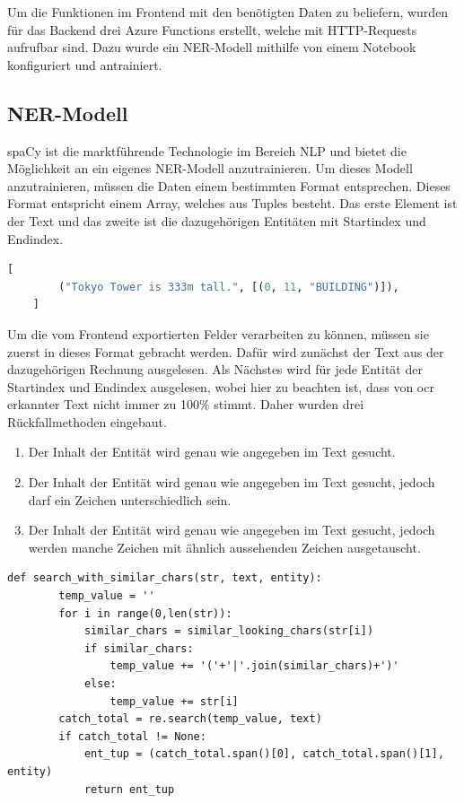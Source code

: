 Um die Funktionen im Frontend mit den benötigten Daten zu beliefern, wurden für das Backend drei Azure Functions erstellt, welche mit HTTP-Requests aufrufbar sind. Dazu wurde ein NER-Modell mithilfe von einem Notebook konfiguriert und antrainiert.

\subsection{NER-Modell}

spaCy ist die marktführende Technologie im Bereich NLP und bietet die Möglichkeit an ein eigenes NER-Modell anzutrainieren. Um dieses Modell anzutrainieren, müssen die Daten einem bestimmten Format entsprechen. Dieses Format entspricht einem Array, welches aus Tuples besteht. Das erste Element ist der Text und das zweite ist die dazugehörigen Entitäten mit Startindex und Endindex.

\begin{lstlisting}[language=Python, caption={Beispiel für ein Array mit Trainingsdaten}]
    [
        ("Tokyo Tower is 333m tall.", [(0, 11, "BUILDING")]),
    ]   
\end{lstlisting}

Um die vom Frontend exportierten Felder verarbeiten zu können, müssen sie zuerst in dieses Format gebracht werden. Dafür wird zunächst der Text aus der dazugehörigen Rechnung ausgelesen. Als Nächstes wird für jede Entität der Startindex und Endindex ausgelesen, wobei hier zu beachten ist, dass von \gls{ocr} erkannter Text nicht immer zu 100\% stimmt. Daher wurden drei Rückfallmethoden eingebaut.

\begin{enumerate}
    \item Der Inhalt der Entität wird genau wie angegeben im Text gesucht.
    \item Der Inhalt der Entität wird genau wie angegeben im Text gesucht, jedoch darf ein Zeichen unterschiedlich sein.
    \item Der Inhalt der Entität wird genau wie angegeben im Text gesucht, jedoch werden manche Zeichen mit ähnlich aussehenden Zeichen ausgetauscht. 
\end{enumerate}

\begin{minipage}{\linewidth}
\begin{lstlisting}[caption={Rückfallmethode 3}, label={search_with_similar_chars}]
    def search_with_similar_chars(str, text, entity):
        temp_value = ''
        for i in range(0,len(str)):
            similar_chars = similar_looking_chars(str[i])
            if similar_chars:
                temp_value += '('+'|'.join(similar_chars)+')'
            else:
                temp_value += str[i]
        catch_total = re.search(temp_value, text)
        if catch_total != None:
            ent_tup = (catch_total.span()[0], catch_total.span()[1], entity)
            return ent_tup
\end{lstlisting}
\end{minipage}

